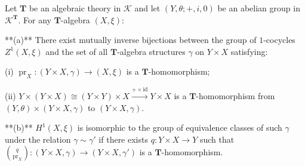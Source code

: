 Let $\mathbf{T}$ be an algebraic theory in $\mathcal{K}$ and let $(Y, \theta; +, i, 0)$ be an abelian group in $\mathcal{K}^{\mathbf{T}}$. For any $\mathbf{T}$-algebra $(X, \xi)$:

**(a)** There exist mutually inverse bijections between the group of $1$-cocycles $Z^1(X, \xi)$ and the set of all $\mathbf{T}$-algebra structures $\gamma$ on $Y \times X$ satisfying:

(i) $\operatorname{pr}_X: (Y \times X, \gamma) \rightarrow (X, \xi)$ is a $\mathbf{T}$-homomorphism;

(ii) $Y \times (Y \times X) \cong (Y \times Y) \times X \xrightarrow{+ \times \text{id}} Y \times X$ is a $\mathbf{T}$-homomorphism from $(Y, \theta) \times (Y \times X, \gamma)$ to $(Y \times X, \gamma)$.

**(b)** $H^1(X, \xi)$ is isomorphic to the group of equivalence classes of such $\gamma$ under the relation $\gamma \sim \gamma'$ if there exists $q: Y \times X \rightarrow Y$ such that $\binom{q}{\operatorname{pr}_X}: (Y \times X, \gamma) \rightarrow (Y \times X, \gamma')$ is a $\mathbf{T}$-homomorphism.
